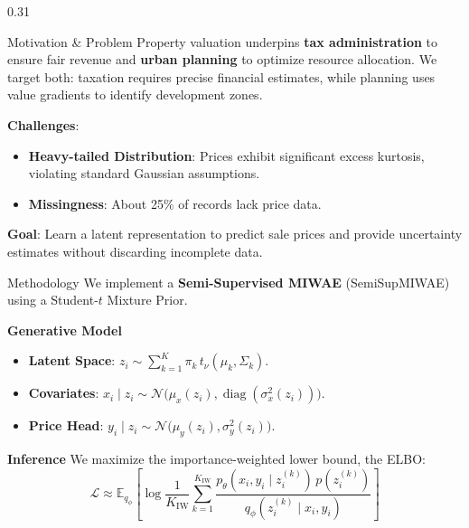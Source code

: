 \documentclass[final,t]{beamer}
\begin{document}
\begin{frame}{}
  \vspace{-1.5cm}
  
  \begin{columns}[t]
    \begin{column}{0.31\paperwidth}
      \begin{block}{Motivation \& Problem}
        Property valuation underpins \textbf{tax administration} to ensure fair revenue and \textbf{urban planning} to optimize resource allocation. We target both: taxation requires precise financial estimates, while planning uses value gradients to identify development zones.
        
        \textbf{Challenges}:
        \begin{itemize}
          \item \textbf{Heavy-tailed Distribution}: Prices exhibit significant excess kurtosis, violating standard Gaussian assumptions. %
          \item \textbf{Missingness}: About 25\% of records lack price data.
        \end{itemize}

        \textbf{Goal}: Learn a latent representation to predict sale prices and provide uncertainty estimates without discarding incomplete data.
      \end{block}

      \begin{block}{Methodology}
        We implement a \textbf{Semi-Supervised MIWAE} (SemiSupMIWAE) using a Student-$t$ Mixture Prior.

        \textbf{Generative Model}
        \begin{itemize}
          \item \textbf{Latent Space}: $z_i \sim \sum_{k=1}^K \pi_k \, t_\nu(\mu_k, \Sigma_k)$.
          \item \textbf{Covariates}: $x_i \mid z_i \sim \mathcal{N}\big(\mu_x(z_i), \operatorname{diag}(\sigma^2_x(z_i))\big)$.
          \item \textbf{Price Head}: $y_i \mid z_i \sim \mathcal{N}\big(\mu_y(z_i), \sigma^2_y(z_i)\big)$.
        \end{itemize}

        \textbf{Inference}
        We maximize the importance-weighted lower bound, the ELBO:
        \[
        \mathcal{L} \approx \mathbb{E}_{q_\phi} \left[ \log \frac{1}{K_{\text{IW}}} \sum_{k=1}^{K_{\text{IW}}} \frac{p_\theta(x_i, y_i \mid z_i^{(k)}) \, p(z_i^{(k)})}{q_\phi(z_i^{(k)} \mid x_i, y_i)} \right]
        \]
      \end{block}


\end{column}
\end{columns}
\end{frame}
\end{document}
